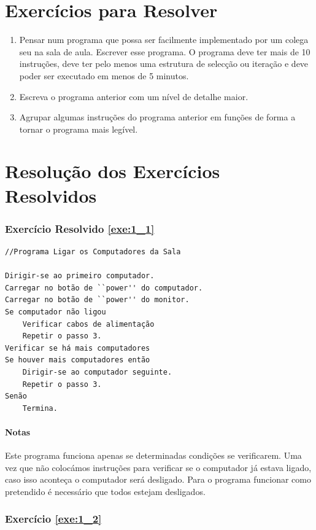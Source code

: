 \section{Exercícios para Resolver}
\begin{enumerate}
\item 
Pensar num programa que possa ser facilmente implementado por um colega seu na sala de aula. Escrever esse programa.  O programa deve ter mais de 10 instruções, deve ter pelo menos uma estrutura de selecção ou iteração e deve poder ser executado em menos de 5 minutos.

\item Escreva o programa anterior com um nível de detalhe maior.

\item Agrupar algumas instruções do programa anterior em funções de forma a tornar o programa mais legível.
\end{enumerate}



\clearpage
\section{Resolução dos Exercícios Resolvidos}


\subsubsection*{Exercício Resolvido \ref{exe:1_1}}
\begin{lstlisting}
//Programa Ligar os Computadores da Sala

Dirigir-se ao primeiro computador.
Carregar no botão de ``power'' do computador.
Carregar no botão de ``power'' do monitor.
Se computador não ligou
	Verificar cabos de alimentação
	Repetir o passo 3.
Verificar se há mais computadores     
Se houver mais computadores então
	Dirigir-se ao computador seguinte.
	Repetir o passo 3.
Senão
	Termina.    
\end{lstlisting}
\paragraph{Notas}
Este programa funciona apenas se determinadas condições se verificarem. Uma vez que 
não colocámos instruções para verificar se o computador já estava ligado, caso
isso aconteça o computador será desligado. Para o programa funcionar como
pretendido é necessário que todos estejam desligados.


\subsubsection*{Exercício \ref{exe:1_2}}


